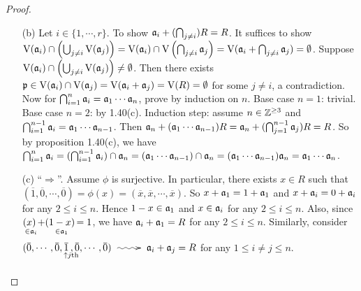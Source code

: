 \begin{proof}
    \begin{enumerate}
        \item [(b)]
            Let $i \in \{1,\cdots,r\}$. To show $\mathfrak{a}_i + (\bigcap_{j \neq i})R = R$. It suffices to show $\operatorname{V}(\mathfrak{a}_i) \cap \left( \bigcup_{j \neq i} \operatorname{V}(\mathfrak{a}_j)\right) = \operatorname{V}(\mathfrak{a}_i) \cap \operatorname{V}\left(\bigcap_{j \neq i} \mathfrak{a}_j\right) = \operatorname{V}(\mathfrak{a}_i + \bigcap_{j \neq i} \mathfrak{a}_j) = \emptyset$. Suppose $\operatorname{V}(\mathfrak{a}_i) \cap \left(\bigcup_{j \neq i}\operatorname{V}(\mathfrak{a}_j)\right) \neq \emptyset$. Then there exists $\mathfrak{p} \in \operatorname{V}(\mathfrak{a}_i) \cap \operatorname{V}(\mathfrak{a}_j) = \operatorname{V}(\mathfrak{a}_i + \mathfrak{a}_j) = \operatorname{V}(R) = \emptyset$ for some $j \neq i$, a contradiction. \\
            Now for $\bigcap_{i=1}^n \mathfrak{a}_i = \mathfrak{a}_1 \cdots \mathfrak{a}_n$, prove by induction on $n$.  Base case $n = 1$: trivial. Base case $n = 2$: by 1.40(c). Induction step: assume $n \in \mathbb{Z}^{\geq 3}$ and $\bigcap_{i=1}^{n-1}\mathfrak{a}_i = \mathfrak{a}_1 \cdots \mathfrak{a}_{n-1}$. Then $\mathfrak{a}_n + (\mathfrak{a}_1 \cdots \mathfrak{a}_{n-1})R = \mathfrak{a}_n + (\bigcap_{j=1}^{n-1} \mathfrak{a}_j)R = R$. So by proposition 1.40(c), we have $\bigcap_{i=1}^n \mathfrak{a}_i = (\bigcap_{i=1}^{n-1} \mathfrak{a}_i) \cap \mathfrak{a}_n = (\mathfrak{a}_1 \cdots \mathfrak{a}_{n-1}) \cap \mathfrak{a}_n = (\mathfrak{a}_1 \cdots \mathfrak{a}_{n-1})\mathfrak{a}_n = \mathfrak{a}_1 \cdots \mathfrak{a}_n$. 
        \item [(c)]
            ``$\Rightarrow$''. Assume $\phi$ is surjective. In particular, there exists $x \in R$ such that $(\overbar 1,\overbar 0,\cdots,\overbar 0) = \phi(x) = (\overbar x, \overbar x, \cdots, \overbar x)$. So $x+\mathfrak{a}_1 = 1+\mathfrak{a}_1$ and $x+\mathfrak{a}_i = 0 + \mathfrak{a}_i$ for any $2 \leq i \leq n$. Hence $1-x \in \mathfrak{a}_1$ and $x \in \mathfrak{a}_i$ for any $2 \leq i \leq n$. Also, since $\mathpunct{\underset{\mathclap{\substack{\ \in \ffa_i \\ \textstyle }}}{(x)}} + \mathpunct{\underset{\mathclap{\substack{\ \in \ffa_1 \\ \textstyle }}}{(1-x)}} = 1$, we have $\mathfrak{a}_i + \mathfrak{a}_1 = R$ for any $2 \leq i \leq n$. Similarly, consider $(\overbar 0, \cdots, \overbar 0, \mathpunct{\underset{\mathclap{\substack{\ \ \ \uparrow j\text{th} \\ \textstyle }}}{\overbar 1}}, \overbar 0, \cdots, \overbar 0) \xymatrix{{}\ar@{~>}[r]&{}} \ffa_i + \ffa_j = R$ for any $1 \leq i \neq j \leq n$. \\

\end{enumerate}
\end{proof}
